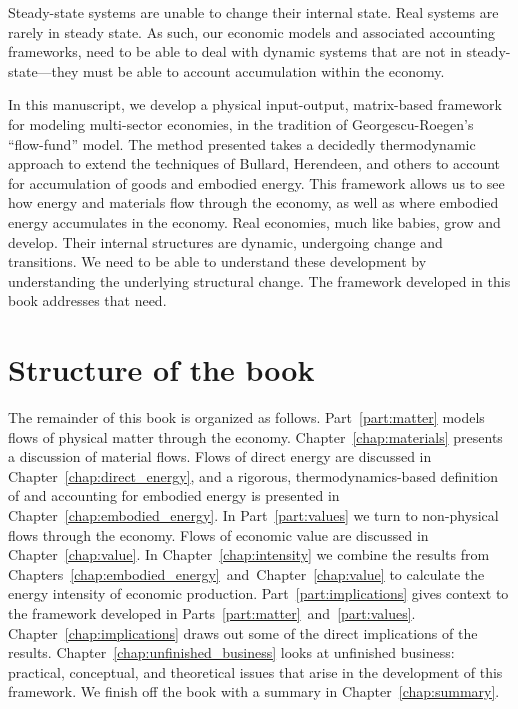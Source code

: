 Steady-state systems are unable to change
their internal state.
Real systems are rarely in steady state.
As such, our economic models
and associated accounting frameworks,
need to be able to deal with dynamic systems
that are not in steady-state---they must
be able to account accumulation within the economy.

In this manuscript, we develop a physical input-output, 
matrix-based framework for modeling multi-sector economies, 
in the tradition of Georgescu-Roegen's ``flow-fund'' 
model.\cite{G-R1979a, G-R1979b} 
The method presented takes a decidedly thermodynamic approach
to extend the techniques of Bullard, Herendeen, and others 
to account for accumulation of goods and embodied energy. 
This framework allows us to see how energy 
and materials flow through the economy, 
as well as where embodied energy accumulates in the economy.
Real economies, 
much like babies,
grow and develop.
Their internal structures are dynamic,
undergoing change and transitions.
We need to be able to understand these development
by understanding the underlying structural change.
The framework developed in this book
addresses that need.

\section{Structure of the book}
\label{sec:structure}

The remainder of this book is organized as follows. 
Part~\ref{part:matter} models flows of physical matter
through the economy.
Chapter~\ref{chap:materials} presents a discussion of material flows.
Flows of direct energy are discussed in Chapter~\ref{chap:direct_energy}, 
and a rigorous, thermodynamics-based definition of and accounting for 
embodied energy is presented in Chapter~\ref{chap:embodied_energy}.
In Part~\ref{part:values} we turn to non-physical flows through the economy. 
Flows of economic value are discussed in Chapter~\ref{chap:value}.
In Chapter~\ref{chap:intensity} we combine the results from 
Chapters~\ref{chap:embodied_energy}~and~Chapter~\ref{chap:value} to
calculate the energy intensity of economic production.
Part~\ref{part:implications} gives context to the framework developed in
Parts~\ref{part:matter}~and~\ref{part:values}.
Chapter~\ref{chap:implications} draws out some of the direct implications
of the results.
Chapter~\ref{chap:unfinished_business} looks at 
unfinished business: practical, conceptual, and theoretical issues
that arise in the development of this framework.
We finish off the book with a summary in Chapter~\ref{chap:summary}.

